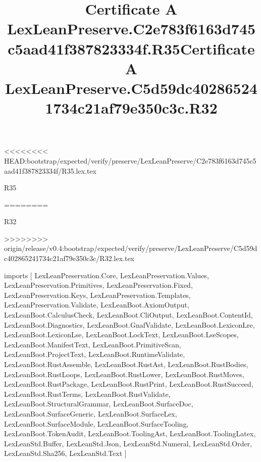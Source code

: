 <<<<<<<< HEAD:bootstrap/expected/verify/preserve/LexLeanPreserve/C2e783f6163d745c5aad41f387823334f/R35.lex.tex
\begin{lexlean}{R35}
\title{Certificate A LexLeanPreserve.C2e783f6163d745c5aad41f387823334f.R35}
========
\begin{lexlean}{R32}
\title{Certificate A LexLeanPreserve.C5d59dc402865241734c21af79e350c3c.R32}
>>>>>>>> origin/release/v0.4:bootstrap/expected/verify/preserve/LexLeanPreserve/C5d59dc402865241734c21af79e350c3c/R32.lex.tex
\begin{coremodule}
imports [
  LexLeanPreservation.Core,
  LexLeanPreservation.Values,
  LexLeanPreservation.Primitives,
  LexLeanPreservation.Fixed,
  LexLeanPreservation.Keys,
  LexLeanPreservation.Templates,
  LexLeanPreservation.Validate,
  LexLeanBoot.AxiomOutput,
  LexLeanBoot.CalculusCheck,
  LexLeanBoot.CliOutput,
  LexLeanBoot.ContentId,
  LexLeanBoot.Diagnostics,
  LexLeanBoot.GnafValidate,
  LexLeanBoot.LexiconLre,
  LexLeanBoot.LexiconLse,
  LexLeanBoot.LockText,
  LexLeanBoot.LseScopes,
  LexLeanBoot.ManifestText,
  LexLeanBoot.PrimitiveScan,
  LexLeanBoot.ProjectText,
  LexLeanBoot.RuntimeValidate,
  LexLeanBoot.RustAssemble,
  LexLeanBoot.RustAst,
  LexLeanBoot.RustBodies,
  LexLeanBoot.RustLoops,
  LexLeanBoot.RustLower,
  LexLeanBoot.RustMoves,
  LexLeanBoot.RustPackage,
  LexLeanBoot.RustPrint,
  LexLeanBoot.RustSucceed,
  LexLeanBoot.RustTerms,
  LexLeanBoot.RustValidate,
  LexLeanBoot.StructuralGrammar,
  LexLeanBoot.SurfaceDoc,
  LexLeanBoot.SurfaceGeneric,
  LexLeanBoot.SurfaceLex,
  LexLeanBoot.SurfaceModule,
  LexLeanBoot.SurfaceTooling,
  LexLeanBoot.TokenAudit,
  LexLeanBoot.ToolingAst,
  LexLeanBoot.ToolingLatex,
  LexLeanStd.Buffer,
  LexLeanStd.Json,
  LexLeanStd.Numeral,
  LexLeanStd.Order,
  LexLeanStd.Sha256,
  LexLeanStd.Text
]


\end{coremodule}
\end{lexlean}
\end{lexlean}
